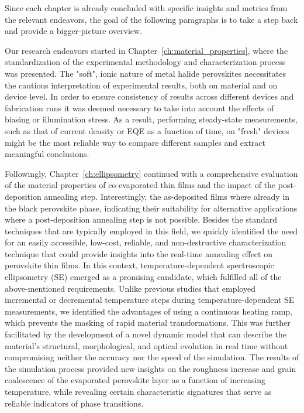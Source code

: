 Since each chapter is already concluded with specific insights and metrics from the relevant endeavors, the goal of the following paragraphs is to take a step back and provide a bigger-picture overview.

Our research endeavors started in Chapter~\ref{ch:material_properties}, where the standardization of the experimental methodology and characterization process was presented. The "soft", ionic nature of metal halide perovskites necessitates the cautious interpretation of experimental results, both on material and on device level. In order to ensure consistency of results across different devices and fabrication runs it was deemed necessary to take into account the effects of biasing or illumination stress. As a result, performing steady-state measurements, such as that of current density or EQE as a function of time, on "fresh" devices might be the most reliable way to compare different samples and extract meaningful conclusions. 


Followingly, Chapter~\ref{ch:ellipsometry} continued with a comprehensive evaluation of the material properties of co-evaporated  thin films and the impact of the post-deposition annealing step. Interestingly, the as-deposited  films where already in the black perovskite phase, indicating their suitability for alternative applications where a post-deposition annealing step is not possible. Besides the standard techniques that are typically employed in this field, we quickly identified the need for an easily accessible, low-cost, reliable, and non-destructive characterization technique that could provide insights into the real-time annealing effect on perovskite thin films. In this context, temperature-dependent spectroscopic ellipsometry (SE) emerged as a promising candidate, which fulfilled all of the above-mentioned requirements. Unlike previous studies that employed incremental or decremental temperature steps during temperature-dependent SE measurements, we identified the advantages of using a continuous heating ramp, which prevents the masking of rapid material transformations. This was further facilitated by the development of a novel dynamic model that can describe the material's structural, morphological, and optical evolution in real time without compromising neither the accuracy nor the speed of the simulation. The results of the simulation process provided new insights on the roughness increase and grain coalescence of the evaporated perovskite layer as a function of increasing temperature, while revealing certain characteristic signatures that serve as reliable indicators of phase transitions.


